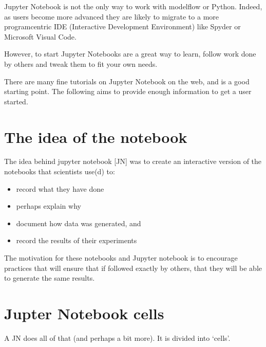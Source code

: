\documentclass[letterpaper,10pt,english]{jupyterBook}
\begin{document}
\sphinxAtStartPar
Jupyter Notebook is not the only way to work with modelflow or Python.  Indeed, as users become more advanced they are likely to migrate to a more program\sphinxhyphen{}centric IDE (Interactive Development Environment) like Spyder or Microsoft Visual Code.

\sphinxAtStartPar
However, to start Jupyter Notebooks are a great way to learn, follow work done by others and tweak them to fit your own needs.

\sphinxAtStartPar
There are many fine tutorials on Jupyter Notebook on the web, and  is a good starting point. The following aims to provide enough information to get a user started.


\section{The idea of the notebook}
\label{\detokenize{content/04_PythonEssentials/Intro_Jupyter_notebook:the-idea-of-the-notebook}}
\sphinxAtStartPar
The idea behind jupyter notebook {[}JN{]} was to create an interactive version of the notebooks that scientists use(d) to:
\begin{itemize}
\item {} 
\sphinxAtStartPar
record what they have done

\item {} 
\sphinxAtStartPar
perhaps explain why

\item {} 
\sphinxAtStartPar
document how data was generated, and

\item {} 
\sphinxAtStartPar
record the results of their experiments

\end{itemize}

\sphinxAtStartPar
The motivation for these notebooks and Jupyter notebook is to encourage practices that will ensure that if followed exactly by others, that they will be able to generate the same results.


\section{Jupter Notebook cells}
\label{\detokenize{content/04_PythonEssentials/Intro_Jupyter_notebook:jupter-notebook-cells}}
\sphinxAtStartPar
A JN does all of that (and perhaps a bit more).  It is divided into ‘cells’.
\end{document}
